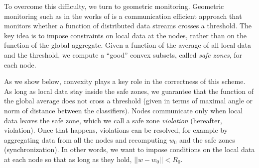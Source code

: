 \par To overcome this difficulty, we turn to geometric monitoring. Geometric
monitoring such as in the works of \cite{keren2014geometric, keren2012shape} is a communication
efficient approach that monitors whether a function of distributed
data streams crosses a threshold. The key idea is to
impose constraints on local data at the nodes, rather than
on the function of the global aggregate. Given a function of
the average of all local data and the threshold, we compute a
``good'' convex subsets, called \textit{safe zones}, for each
node.

\par As we show below, convexity
plays a key role in the correctness of this scheme. As long
as local data stay inside the safe zones, we guarantee that
the function of the global average does not cross a threshold (given
in terms of maximal angle or norm of distance between the classifiers).
Nodes communicate only when local data leaves the
safe zone, which we call a safe zone \textit{violation} (hereafter,
violation). Once that happens, violations can be resolved,
for example by aggregating data from all the nodes and recomputing $w_0$
and the safe zones (synchronization).
In other words, we want to impose conditions on the local
data at each node so that as long as they hold, $||w-w_0||<R_0$.

